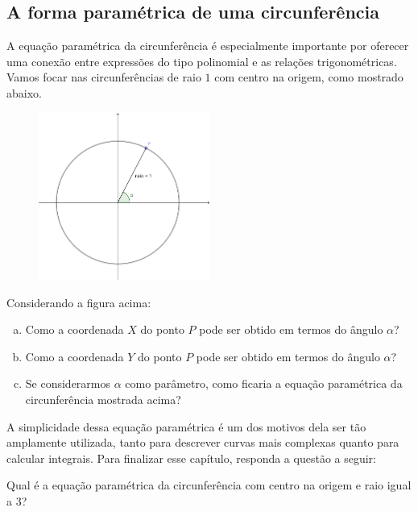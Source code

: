 \documentclass[main_estudante.tex]{subfiles}
\begin{document}
\subsection*{A forma paramétrica de uma circunferência}

A equação paramétrica da circunferência é especialmente importante por oferecer uma conexão entre expressões do tipo polinomial e as relações trigonométricas. Vamos focar nas circunferências de raio $1$ com centro na origem, como mostrado abaixo.

\begin{figure}[h]
\centering
\includegraphics[width=0.5\textwidth]{./img/c6q15.png}
\end{figure}

\begin{questao}
Considerando a figura acima:
\begin{enumerate}[a)]
\item Como a coordenada $X$ do ponto $P$ pode ser obtido em termos do ângulo $\alpha$?
\item Como a coordenada $Y$ do ponto $P$ pode ser obtido em termos do ângulo $\alpha$?
\item Se considerarmos $\alpha$ como parâmetro, como ficaria a equação paramétrica da circunferência mostrada acima?
\end{enumerate} 
\end{questao}

A simplicidade dessa equação paramétrica é um dos motivos dela ser tão amplamente utilizada, tanto para descrever curvas mais complexas quanto para calcular integrais. Para finalizar esse capítulo, responda a questão a seguir:

\begin{questao}
Qual é a equação paramétrica da circunferência com centro na origem e raio igual a 3?
\end{questao}
\end{document}
